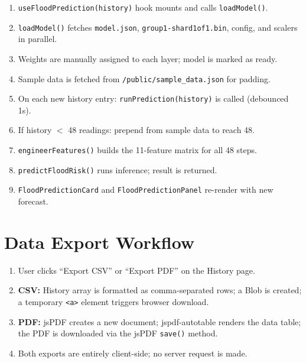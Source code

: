 \begin{enumerate}[leftmargin=1.5em]
  \item \texttt{useFloodPrediction(history)} hook mounts and calls \texttt{loadModel()}.
  \item \texttt{loadModel()} fetches \texttt{model.\allowbreak{}json}, \texttt{group1-shard1of1.\allowbreak{}bin}, config, and scalers in parallel.
  \item Weights are manually assigned to each layer; model is marked as ready.
  \item Sample data is fetched from \texttt{/\allowbreak{}public/\allowbreak{}sample\_\allowbreak{}data.\allowbreak{}json} for padding.
  \item On each new history entry: \texttt{runPrediction(history)} is called (debounced 1s).
  \item If history $<$ 48 readings: prepend from sample data to reach 48.
  \item \texttt{engineerFeatures()} builds the 11-feature matrix for all 48 steps.
  \item \texttt{predictFloodRisk()} runs inference; result is returned.
  \item \texttt{FloodPredictionCard} and \texttt{FloodPredictionPanel} re-render with new forecast.
\end{enumerate}

\section{Data Export Workflow}

\begin{enumerate}[leftmargin=1.5em]
  \item User clicks ``Export CSV'' or ``Export PDF'' on the History page.
  \item \textbf{CSV:} History array is formatted as comma-separated rows; a Blob is created; a temporary \texttt{<a>} element triggers browser download.
  \item \textbf{PDF:} jsPDF creates a new document; jspdf-autotable renders the data table; the PDF is downloaded via the jsPDF \texttt{save()} method.
  \item Both exports are entirely client-side; no server request is made.
\end{enumerate}
